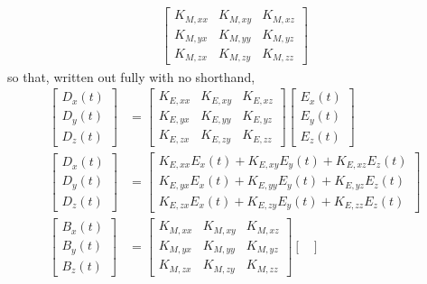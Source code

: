\begin{itemize}
\begin{align*}
\begin{bmatrix}
        K_{M,xx} & K_{M,xy} & K_{M,xz} \\
        K_{M,yx} & K_{M,yy} & K_{M,yz} \\
        K_{M,zx} & K_{M,zy} & K_{M,zz}
      \end{bmatrix}
    \end{align*}
    so that, written out fully with no shorthand,
    \begin{align*}
      \begin{bmatrix}
        D_x(t) \\
        D_y(t) \\
        D_z(t)
      \end{bmatrix}
      &=
      \begin{bmatrix}
        K_{E,xx} & K_{E,xy} & K_{E,xz} \\
        K_{E,yx} & K_{E,yy} & K_{E,yz} \\
        K_{E,zx} & K_{E,zy} & K_{E,zz}
      \end{bmatrix}
      \begin{bmatrix}
        E_x(t) \\
        E_y(t) \\
        E_z(t)
      \end{bmatrix} \\
      \begin{bmatrix}
        D_x(t) \\
        D_y(t) \\
        D_z(t)
      \end{bmatrix}
      &=
      \begin{bmatrix}
        K_{E,xx} E_x(t) + K_{E,xy} E_y(t) + K_{E,xz} E_z(t) \\
        K_{E,yx} E_x(t) + K_{E,yy} E_y(t) + K_{E,yz} E_z(t) \\
        K_{E,zx} E_x(t) + K_{E,zy} E_y(t) + K_{E,zz} E_z(t)
      \end{bmatrix} \\
      \begin{bmatrix}
        B_x(t) \\
        B_y(t) \\
        B_z(t)
      \end{bmatrix}
      &=
      \begin{bmatrix}
        K_{M,xx} & K_{M,xy} & K_{M,xz} \\
        K_{M,yx} & K_{M,yy} & K_{M,yz} \\
        K_{M,zx} & K_{M,zy} & K_{M,zz}
      \end{bmatrix}
      \begin{bmatrix}

\end{bmatrix}
\end{align*}
\end{itemize}

